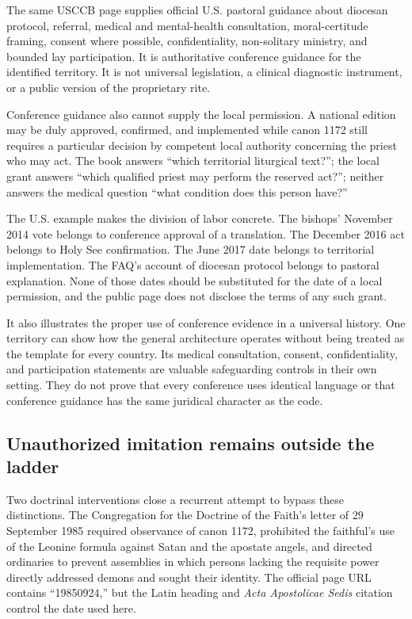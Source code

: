 The same USCCB page supplies official U.S. pastoral guidance about diocesan
protocol, referral, medical and mental-health consultation, moral-certitude
framing, consent where possible, confidentiality, non-solitary ministry, and
bounded lay participation. It is authoritative conference guidance for the
identified territory. It is not universal legislation, a clinical diagnostic
instrument, or a public version of the proprietary rite.

Conference guidance also cannot supply the local permission. A national
edition may be duly approved, confirmed, and implemented while canon 1172
still requires a particular decision by competent local authority concerning
the priest who may act. The book answers ``which territorial liturgical
text?''; the local grant answers ``which qualified priest may perform the
reserved act?''; neither answers the medical question ``what condition does
this person have?''

The U.S. example makes the division of labor concrete. The bishops'
November 2014 vote belongs to conference approval of a translation. The
December 2016 act belongs to Holy See confirmation. The June 2017 date belongs
to territorial implementation. The FAQ's account of diocesan protocol belongs
to pastoral explanation. None of those dates should be substituted for the
date of a local permission, and the public page does not disclose the terms of
any such grant.

It also illustrates the proper use of conference evidence in a universal
history. One territory can show how the general architecture operates without
being treated as the template for every country. Its medical consultation,
consent, confidentiality, and participation statements are valuable
safeguarding controls in their own setting. They do not prove that every
conference uses identical language or that conference guidance has the same
juridical character as the code.

\subsection{Unauthorized imitation remains outside the ladder}

Two doctrinal interventions close a recurrent attempt to bypass these
distinctions. The Congregation for the Doctrine of the Faith's letter of 29
September 1985 required observance of canon 1172, prohibited the faithful's
use of the Leonine formula against Satan and the apostate angels, and directed
ordinaries to prevent assemblies in which persons lacking the requisite power
directly addressed demons and sought their identity. The official page URL
contains ``19850924,'' but the Latin heading and \emph{Acta Apostolicae Sedis}
citation control the date used here.

